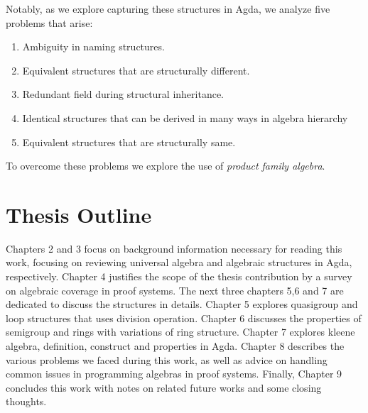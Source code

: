 Notably, as we explore capturing these structures in Agda, we analyze five problems that arise:
\begin{enumerate}
\item Ambiguity in naming structures.
\item Equivalent structures that are structurally different.
\item Redundant field during structural inheritance.
\item Identical structures that can be derived in many ways in algebra hierarchy
\item Equivalent structures that are structurally same.
\end{enumerate}
To overcome these problems we explore the use of \textit{product family
algebra}.

\section{Thesis Outline}
Chapters 2 and 3 focus on background information necessary for reading this
work, focusing on reviewing universal algebra and algebraic structures in Agda,
respectively. Chapter 4 justifies the scope of the thesis contribution by a
survey on algebraic coverage in proof systems. The next three chapters 5,6 and 7
are dedicated to discuss the structures in details. Chapter 5 explores
quasigroup and loop structures that uses division operation. Chapter 6 discusses
the properties of semigroup and rings with variations of ring structure. Chapter
7 explores kleene algebra, definition, construct and properties in Agda. Chapter
8 describes the various problems we faced during this work, as well as advice on
handling common issues in programming algebras in proof systems. Finally,
Chapter 9 concludes this work with notes on related future works and some
closing thoughts.
